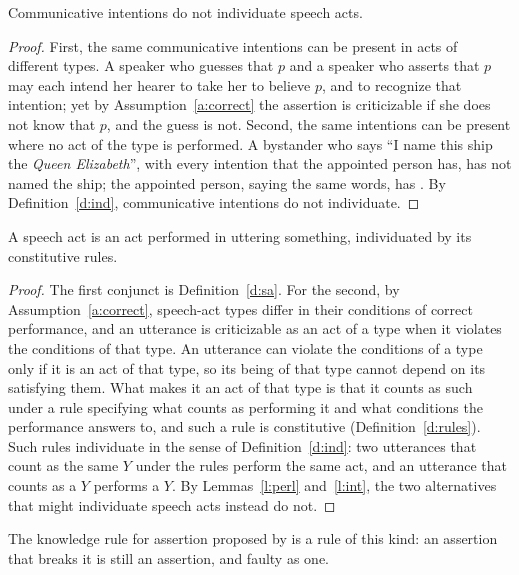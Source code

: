 \documentclass{situationist-preprint}
\begin{document}
\begin{lemma}\label{l:int}
Communicative intentions do not individuate speech acts.
\end{lemma}

\begin{proof}
First, the same communicative intentions can be present in acts of different types. A speaker who guesses that $p$ and a speaker who asserts that $p$ may each intend her hearer to take her to believe $p$, and to recognize that intention; yet by Assumption~\ref{a:correct} the assertion is criticizable if she does not know that $p$, and the guess is not. Second, the same intentions can be present where no act of the type is performed. A bystander who says \enquote{I name this ship the \emph{Queen Elizabeth}}, with every intention that the appointed person has, has not named the ship; the appointed person, saying the same words, has \citep{Austin1962}. By Definition~\ref{d:ind}, communicative intentions do not individuate.
\end{proof}

\begin{theorem}\label{t:main}
A speech act is an act performed in uttering something, individuated by its constitutive rules.
\end{theorem}

\begin{proof}
The first conjunct is Definition~\ref{d:sa}. For the second, by Assumption~\ref{a:correct}, speech-act types differ in their conditions of correct performance, and an utterance is criticizable as an act of a type when it violates the conditions of that type. An utterance can violate the conditions of a type only if it is an act of that type, so its being of that type cannot depend on its satisfying them. What makes it an act of that type is that it counts as such under a rule specifying what counts as performing it and what conditions the performance answers to, and such a rule is constitutive (Definition~\ref{d:rules}). Such rules individuate in the sense of Definition~\ref{d:ind}: two utterances that count as the same $Y$ under the rules perform the same act, and an utterance that counts as a $Y$ performs a $Y$. By Lemmas~\ref{l:perl} and~\ref{l:int}, the two alternatives that might individuate speech acts instead do not.
\end{proof}

The knowledge rule for assertion proposed by \citet{Williamson2000} is a rule of this kind: an assertion that breaks it is still an assertion, and faulty as one.
\end{document}
